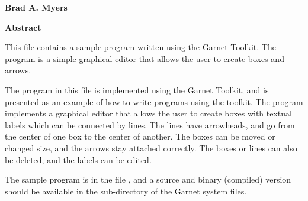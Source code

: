 \begin{titlepage}

\begin{titlebox}
\vspace{0.6 inch}

{\bf Brad A. Myers}
\vspace{0.3 line}
\value{date}
\end{titlebox}
\vspace{0.5 inch}
\begin{center}
{\bf Abstract}\end{center}
\begin{text}
This file contains a sample program written using the Garnet Toolkit.  The
program is a simple graphical editor that allows the user to create boxes
and arrows.

\vspace{0.5 inch}

\end{text}
\end{titlepage}




The program in this file is implemented using the Garnet Toolkit, and is
presented as an example of how to write programs using the toolkit.  The
program implements a graphical editor that allows the user to create boxes
with textual labels which can be connected by lines.  The lines have
arrowheads, and go from the center of one box to the center of another.
The boxes can be moved or changed size, and the arrows stay attached
correctly.  The boxes or lines can also be deleted, and the labels can be
edited.

The sample program is in the file , and a source and
binary (compiled) version should be available in the 
sub-directory of the Garnet system files.


